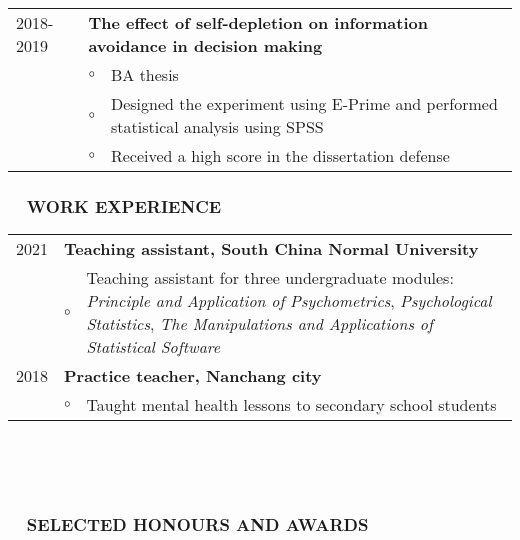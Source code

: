 \documentclass[a4paper, 12pt]{article}
\begin{document}
\begin{tabularx}{\textwidth}{p{2cm} p{0.1cm} X}
    2018-2019 & \multicolumn{2}{X}{\textbf{The effect of self-depletion on information avoidance in decision making}} \\
    & $\circ$ & BA thesis \\
    & $\circ$ & Designed the experiment using E-Prime and performed statistical analysis using SPSS \\
    & $\circ$ & Received a high score in the dissertation defense \\

    \end{tabularx}

\subsubsection*{ \ \ WORK EXPERIENCE}

\begin{tabularx}{\textwidth}{p{2cm} p{0.1cm} X}


    2021 & \multicolumn{2}{X}{\textbf{Teaching assistant, South China Normal University}} \\
    & $ \circ $ & Teaching assistant for three undergraduate modules: \textit{Principle and Application of Psychometrics}, \textit{Psychological Statistics}, \textit{The Manipulations and Applications of Statistical Software} \\

    2018 & \multicolumn{2}{X}{\textbf{Practice teacher, Nanchang city}} \\
    & $ \circ $ & Taught mental health lessons to secondary school students

    \end{tabularx}

\  \par 
\  \par 



\subsubsection*{ \ \ SELECTED HONOURS AND AWARDS}
\end{document}
